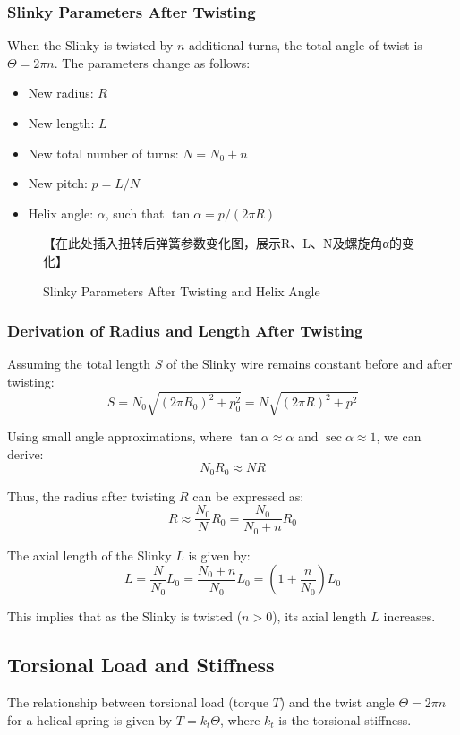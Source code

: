 \documentclass{mcmthesis}  %
\begin{document}
\subsubsection{Slinky Parameters After Twisting}
When the Slinky is twisted by \(n\) additional turns, the total angle of twist is \(\Theta = 2\pi n\). The parameters change as follows:
\begin{itemize}
    \item New radius: \(R\)
    \item New length: \(L\)
    \item New total number of turns: \(N = N_0 + n\)
    \item New pitch: \(p = L / N\)
    \item Helix angle: \(\alpha\), such that \(\tan \alpha = p / (2\pi R)\)
\end{itemize}

\begin{figure}[h!]
    \centering
    【在此处插入扭转后弹簧参数变化图，展示R、L、N及螺旋角α的变化】
    \caption{Slinky Parameters After Twisting and Helix Angle}
    \label{fig:twisted_params}
\end{figure}

\subsubsection{Derivation of Radius and Length After Twisting}
Assuming the total length \(S\) of the Slinky wire remains constant before and after twisting:
\[ S = N_0 \sqrt{(2\pi R_0)^2 + p_0^2} = N \sqrt{(2\pi R)^2 + p^2} \]

Using small angle approximations, where \(\tan \alpha \approx \alpha\) and \(\sec \alpha \approx 1\), we can derive:
\[ N_0 R_0 \approx N R \]

Thus, the radius after twisting \(R\) can be expressed as:
\[ R \approx \frac{N_0}{N} R_0 = \frac{N_0}{N_0 + n} R_0 \]

The axial length of the Slinky \(L\) is given by:
\[ L = \frac{N}{N_0} L_0 = \frac{N_0+n}{N_0} L_0 = \left(1 + \frac{n}{N_0}\right) L_0 \]

This implies that as the Slinky is twisted (\(n > 0\)), its axial length \(L\) increases.

\subsection{Torsional Load and Stiffness}
The relationship between torsional load (torque \(T\)) and the twist angle \(\Theta = 2\pi n\) for a helical spring is given by \(T = k_t \Theta\), where \(k_t\) is the torsional stiffness.
\end{document}
